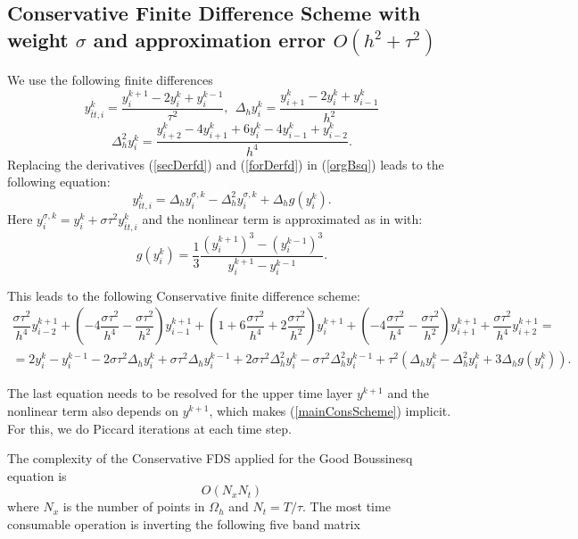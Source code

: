 \documentclass[%
 aip,
cp,  
 amsmath,amssymb,
 reprint,
]{iopconfser}
\newcommand{\rf}[1]{(\ref{#1})}
\begin{document}
\subsection{ Conservative Finite Difference Scheme with weight $\sigma$ and approximation error $O(h^2+\tau^2)$}

We use the following finite differences
\begin{equation}\label{secDerfd}
y_{\bar{t}t,i}^k=\dfrac{y_i^{k+1}-2y_i^k+y_i^{k-1}}{\tau^2},~~\Delta_h y_i^k=\dfrac{y_{i+1}^k-2y_i^k+y_{i-1}^k}{h^2}
\end{equation}
\begin{equation}\label{forDerfd}
\Delta_h^2 y_i^k=\dfrac{y_{i+2}^k-4y_{i+1}^k+6y_{i}^k-4y_{i-1}^k+y_{i-2}^k}{h^4}.
\end{equation}
Replacing the derivatives \rf{secDerfd} and \rf{forDerfd} in \rf{orgBsq} leads to the following equation:
\begin{equation}\label{scheme1}
y_{\bar{t}t,i}^k=\Delta_h y_i^{\sigma,k}-\Delta_h^2 y_i^{\sigma,k} +\Delta_h g(y_i^k).
\end{equation}
Here $ y_i^{\sigma,k}= y_i^{k}+\sigma \tau^2 y_{\bar{t}t,i}^k$ and the nonlinear term is approximated as in \cite{consCitat} with:
\begin{equation}\label{nonLin}
g(y_i^k) = \frac{1}{3} \frac{(y_i^{k+1})^3 - (y_i^{k-1})^3}{y_i^{k+1} - y_i^{k-1}}.
\end{equation}

This leads to the following Conservative finite difference scheme:
\begin{eqnarray}\label{mainConsScheme}
\dfrac{\sigma\tau^2}{h^4}y_{i-2}^{k+1}+\left(-4\dfrac{\sigma\tau^2}{h^4}-\dfrac{\sigma\tau^2}{h^2}\right)y_{i-1}^{k+1}+\left(1+6\dfrac{\sigma\tau^2}{h^4}+2\dfrac{\sigma\tau^2}{h^2}\right)y_{i}^{k+1}+\left(-4\dfrac{\sigma\tau^2}{h^4}-\dfrac{\sigma\tau^2}{h^2}\right)y_{i+1}^{k+1}+\dfrac{\sigma\tau^2}{h^4}y_{i+2}^{k+1}=\nonumber\\
=2y_i^k-y_i^{k-1}-2\sigma\tau^2\Delta_h y_i^k+\sigma\tau^2\Delta_hy_i^{k-1}+2\sigma\tau^2\Delta_h^2y_i^k-\sigma\tau^2\Delta_h^2y_i^{k-1}+\tau^2\left(\Delta_hy_i^k-\Delta_h^2y_i^k+3\Delta_h g(y_i^k)\right).
\end{eqnarray}

The last equation needs to be resolved for the upper time layer $y^{k+1}$ and the nonlinear term also depends on $y^{k+1}$, which makes \rf{mainConsScheme} implicit. For this, we do Piccard iterations at each time step.

The complexity of the Conservative FDS applied for the Good Boussinesq equation is
$$ O( N_x  N_t ) $$
where $N_x$ is the number of points in $\Omega_h$ and $N_t = T/\tau$. The most time consumable operation is inverting the following five band matrix 
\end{document}

